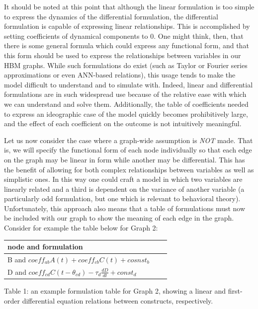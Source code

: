 \documentclass[runningheads,a4paper]{llncs}
\begin{document}
It should be noted at this point that although the linear formulation is too simple to express the dynamics of the differential formulation, the differential formulation is capable of expressing linear relationships.
This is accomplished by setting coefficients of dynamical components to 0.
One might think, then, that there is some general formula which could express any functional form, and that this form should be used to express the relationships between variables in our HBM graphs.
While such formulations do exist (such as Taylor or Fourier series approximations or even ANN-based relations), this usage tends to make the model difficult to understand and to simulate with.
Indeed, linear and differential formulations are in such widespread use because of the relative ease with which we can understand and solve them. 
Additionally, the table of coefficients needed to express an ideographic case of the model quickly becomes prohibitively large, and the effect of each coefficient on the outcome is not intuitively meaningful.

Let us now consider the case where a graph-wide assumption is \emph{NOT} made.
That is, we will specify the functional form of each node individually so that each edge on the graph may be linear in form while another may be differential.
This has the benefit of allowing for both complex relationships between variables as well as simplistic ones.
In this way one could craft a model in which two variables are linearly related and a third is dependent on the variance of another variable (a particularly odd formulation, but one which is relevant to behavioral theory).
Unfortunately, this approach also means that a table of formulations must now be included with our graph to show the meaning of each edge in the graph.
Consider for example the table below for Graph 2:

\begin{centering}
  \begin{tabular}{ | l | l | l |}
      \hline
      node and formulation \\ \hline
      B and $coeff_{ab}A(t) + coeff_{cb}C(t) + cosnst_b$  \\ \hline
      D and $coeff_{cd}C(t-\theta_{cd}) - \tau_{d}\frac{dD}{dt} + const_d$ \\ \hline
  \end{tabular}
  
  Table 1: an example formulation table for Graph 2, showing a linear and first-order differential equation relations between constructs, respectively.
\end{centering}
\end{document}
